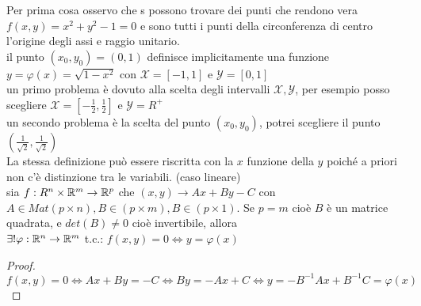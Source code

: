 	Per prima cosa osservo che s possono trovare dei punti che rendono vera $f(x,y)=x^2+y^2-1=0$ e sono tutti i punti della circonferenza di centro l'origine degli assi e raggio unitario.\\
	il punto $(x_0,y_0)=(0,1)$ definisce implicitamente una funzione $y=\varphi(x)=\sqrt{1-x^2}$ con $\mathcal{X}=[-1,1]$ e $\mathcal{Y}=[0,1]$\\
	un primo problema è dovuto alla scelta degli intervalli $\mathcal{X},\mathcal{Y}$, per esempio posso scegliere $\mathcal{X}=[-\frac{1}{2},\frac{1}{2}]$ e $\mathcal{Y}=R^+$\\
	un secondo problema è la scelta del punto $(x_0,y_0)$, potrei scegliere il punto $(\frac{1}{\sqrt{2}},\frac{1}{\sqrt{2}})$\\
\observation
La stessa definizione può essere riscritta con la $x$ funzione della $y$ poiché a priori non c'è distinzione tra le variabili.
\proposition (caso lineare)\\
sia $f:R^n\times \mathbb{R}^m\rightarrow \mathbb{R}^p$ che $(x,y)\rightarrow Ax+By-C$ con $A\in Mat(p \times n), B\in (p \times m), B\in (p \times 1)$. Se $p=m$ cioè $B$ è un matrice quadrata, e $det(B)\ne 0$ cioè invertibile, allora\\
$\exists !\varphi : \mathbb{R}^n\rightarrow \mathbb{R}^m$ t.c.: $f(x,y)=0 \Leftrightarrow y=\varphi(x)$
\begin{proof}
	$f(x,y)=0\Leftrightarrow Ax+By=-C\Leftrightarrow By=-Ax+C\Leftrightarrow y=-B^{-1}Ax+B^{-1}C = \varphi(x)$
\end{proof}
